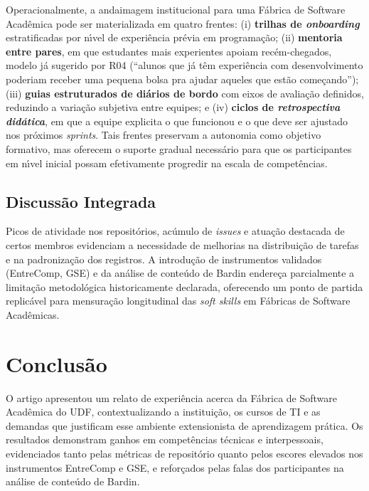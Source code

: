 \documentclass[12pt,a4paper]{article}
\begin{document}
Operacionalmente, a andaimagem institucional para uma F\'abrica de
Software Acad\^emica pode ser materializada em quatro frentes: (i)
\textbf{trilhas de \emph{onboarding}} estratificadas por n\'\i vel de
experi\^encia pr\'evia em programa\c{c}\~ao; (ii) \textbf{mentoria entre
pares}, em que estudantes mais experientes apoiam recém-chegados, modelo
j\'a sugerido por R04 (``alunos que j\'a t\^em experi\^encia com
desenvolvimento poderiam receber uma pequena bolsa pra ajudar aqueles
que est\~ao come\c{c}ando''); (iii) \textbf{guias estruturados de
di\'arios de bordo} com eixos de avalia\c{c}\~ao definidos, reduzindo a
varia\c{c}\~ao subjetiva entre equipes; e (iv) \textbf{ciclos de
\emph{retrospectiva did\'atica}}, em que a equipe explicita o que
funcionou e o que deve ser ajustado nos pr\'oximos \emph{sprints}.
Tais frentes preservam a autonomia como objetivo formativo, mas
oferecem o suporte gradual necess\'ario para que os participantes em
n\'\i vel inicial possam efetivamente progredir na escala de
compet\^encias.

\subsection{Discuss\~ao Integrada}
Picos de atividade nos reposit\'orios, ac\'umulo de \emph{issues} e
atua\c{c}\~ao destacada de certos membros evidenciam a necessidade de
melhorias na distribui\c{c}\~ao de tarefas e na padroniza\c{c}\~ao dos
registros. A introdu\c{c}\~ao de instrumentos validados (EntreComp,
GSE) e da an\'alise de conte\'udo de Bardin endere\c{c}a parcialmente a
limita\c{c}\~ao metodol\'ogica historicamente declarada, oferecendo um
ponto de partida replic\'avel para mensura\c{c}\~ao longitudinal das
\emph{soft skills} em F\'abricas de Software Acad\^emicas.

\section{Conclus\~ao}
\label{sec:conclusao}

O artigo apresentou um relato de experi\^encia acerca da F\'abrica de
Software Acad\^emica do UDF, contextualizando a institui\c{c}\~ao, os
cursos de TI e as demandas que justificam esse ambiente extensionista de
aprendizagem pr\'atica. Os resultados demonstram ganhos em
compet\^encias t\'ecnicas e interpessoais, evidenciados tanto pelas
m\'etricas de reposit\'orio quanto pelos escores elevados nos
instrumentos EntreComp e GSE, e refor\c{c}ados pelas falas dos
participantes na an\'alise de conte\'udo de Bardin.
\end{document}
